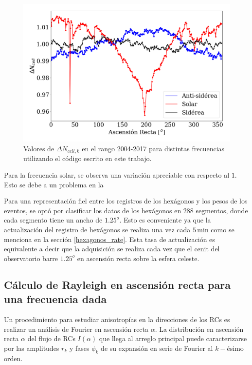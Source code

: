        \begin{figure}[H]
          \centering
              \includegraphics[width=0.75\linewidth]{weigths_2020.png}
              \caption{Valores de $\Delta N_{cell, k}$ en el rango 2004-2017 para distintas frecuencias utilizando el código escrito en este trabajo.}
              \label{fig:pesos_ejemplo}
        \end{figure}

      Para la frecuencia solar, se observa una variación apreciable con respecto al $1$. Esto se debe a un problema en la 

    Para una representación fiel entre los registros de los hexágonos y los pesos de los eventos, se optó por clasificar los datos de los hexágonos en $288$ segmentos, donde cada segmento tiene un ancho de $1.25^o$. Esto es conveniente ya que la actualización del registro de hexágonos se realiza una vez  cada $5\,$min como se menciona en la sección \ref{hexagonos_rate}. Esta tasa de actualización es equivalente a decir que la adquisición se realiza cada vez que el cenit del observatorio barre  $1.25^o$ en ascensión recta sobre la esfera celeste.


  \subsection{Cálculo de Rayleigh en ascensión recta para una frecuencia dada} \label{rayleigh}

  
  Un procedimiento para estudiar anisotropías en la direcciones de los RCs es realizar un análisis de Fourier en ascensión recta $\alpha$. La distribución en ascensión recta $\alpha$ del flujo de RCs $I(\alpha)$ que llega al arreglo principal puede caracterizarse por las amplitudes $r_k$ y fases $\phi_k$ de su expansión en serie de Fourier al $k-$ésimo orden. 

